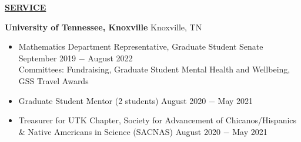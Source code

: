 \documentclass{article}
\begin{document}
\vspace{16pt}

\begin{center}
    \textbf{\underline{SERVICE}}
\end{center}
\textbf{University of Tennessee, Knoxville} \hfill Knoxville, TN
\begin{itemize}[noitemsep,nolistsep,leftmargin=*]
    \item Mathematics Department Representative, Graduate Student Senate
  \hfill September 2019 $-$ August 2022
\\
    Committees: Fundraising, Graduate Student Mental Health and Wellbeing, GSS Travel Awards
    \item  Graduate Student Mentor (2 students)
  \hfill August 2020 $-$ May 2021
    \item Treasurer for UTK Chapter, Society for Advancement of Chicanos/Hispanics \& Native Americans in Science (SACNAS)
  \hfill August 2020 $-$ May 2021
\end{itemize}

\vspace{16pt}


% 
%


%
%



\end{document}
